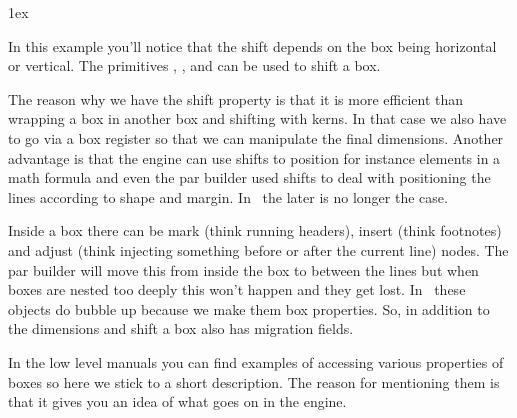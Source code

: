 \boxshift\scratchboxtwo 1ex \box\scratchboxone\box\scratchboxtwo
\stopbuffer

\typebuffer

In this example you'll notice that the shift depends on the box being horizontal
or vertical. The primitives \type {\raise}, \type {\lower}, \type {\moveleft} and
\type {\moveright} can be used to shift a box.

\startlinecorrection
\getbuffer
\stoplinecorrection

The reason why we have the shift property is that it is more efficient than
wrapping a box in another box and shifting with kerns. In that case we also have
to go via a box register so that we can manipulate the final dimensions. Another
advantage is that the engine can use shifts to position for instance elements in
a math formula and even the par builder used shifts to deal with positioning the
lines according to shape and margin. In \LUAMETATEX\ the later is no longer the
case.

Inside a box there can be mark (think running headers), insert (think footnotes)
and adjust (think injecting something before or after the current line) nodes. The
par builder will move this from inside the box to between the lines but when boxes
are nested too deeply this won't happen and they get lost. In \LUAMETATEX\ these
objects do bubble up because we make them box properties. So, in addition to
the dimensions and shift a box also has migration fields.

In the low level manuals you can find examples of accessing various properties of
boxes so here we stick to a short description. The reason for mentioning them is
that it gives you an idea of what goes on in the engine.

